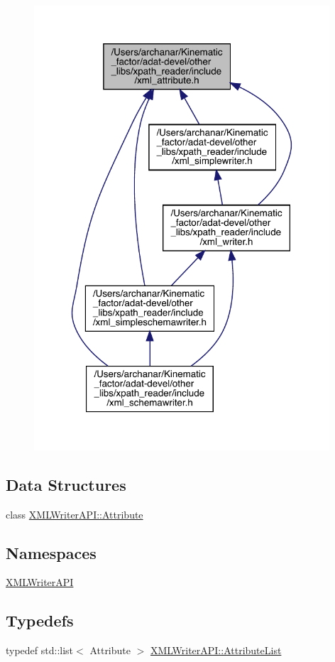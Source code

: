 \begin{figure}[H]
\begin{center}
\leavevmode
\includegraphics[width=312pt]{d6/d6e/adat-devel_2other__libs_2xpath__reader_2include_2xml__attribute_8h__dep__incl}
\end{center}
\end{figure}
\subsection*{Data Structures}
\begin{DoxyCompactItemize}
\item 
class \mbox{\hyperlink{classXMLWriterAPI_1_1Attribute}{X\+M\+L\+Writer\+A\+P\+I\+::\+Attribute}}
\end{DoxyCompactItemize}
\subsection*{Namespaces}
\begin{DoxyCompactItemize}
\item 
 \mbox{\hyperlink{namespaceXMLWriterAPI}{X\+M\+L\+Writer\+A\+PI}}
\end{DoxyCompactItemize}
\subsection*{Typedefs}
\begin{DoxyCompactItemize}
\item 
typedef std\+::list$<$ Attribute $>$ \mbox{\hyperlink{namespaceXMLWriterAPI_a28cf3d8051a4ccf0aef208b7ebc66d07}{X\+M\+L\+Writer\+A\+P\+I\+::\+Attribute\+List}}
\end{DoxyCompactItemize}
